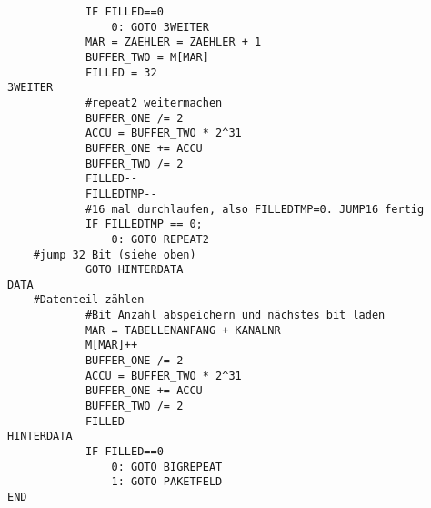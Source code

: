 {\begin{verbatim}
            IF FILLED==0
                0: GOTO 3WEITER
            MAR = ZAEHLER = ZAEHLER + 1
            BUFFER_TWO = M[MAR]
            FILLED = 32
3WEITER
            #repeat2 weitermachen
            BUFFER_ONE /= 2
            ACCU = BUFFER_TWO * 2^31
            BUFFER_ONE += ACCU
            BUFFER_TWO /= 2
            FILLED--
            FILLEDTMP--
            #16 mal durchlaufen, also FILLEDTMP=0. JUMP16 fertig
            IF FILLEDTMP == 0;
                0: GOTO REPEAT2
    #jump 32 Bit (siehe oben)
            GOTO HINTERDATA
DATA
    #Datenteil zählen
            #Bit Anzahl abspeichern und nächstes bit laden
            MAR = TABELLENANFANG + KANALNR
            M[MAR]++
            BUFFER_ONE /= 2
            ACCU = BUFFER_TWO * 2^31
            BUFFER_ONE += ACCU
            BUFFER_TWO /= 2
            FILLED--
HINTERDATA
            IF FILLED==0
                0: GOTO BIGREPEAT
                1: GOTO PAKETFELD
END
\end{verbatim}}